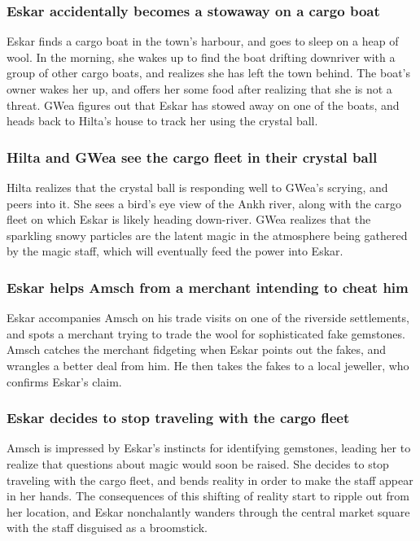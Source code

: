 \subsubsection{\Gls{Eskar} accidentally becomes a stowaway on a cargo boat}
\Gls{Eskar} finds a cargo boat in the town's harbour, and goes to sleep on a heap of wool. In the
morning, she wakes up to find the boat drifting downriver with a group of other cargo boats, and
realizes she has left the town behind. The boat's owner wakes her up, and offers her some food after
realizing that she is not a threat. \Gls{GWea} figures out that \Gls{Eskar} has stowed away on one
of the boats, and heads back to \Gls{Hilta}'s house to track her using the crystal ball.

\subsubsection{\Gls{Hilta} and \Gls{GWea} see the cargo fleet in their crystal ball}
\Gls{Hilta} realizes that the crystal ball is responding well to \Gls{GWea}'s scrying, and peers
into it. She sees a bird's eye view of the Ankh river, along with the cargo fleet on which
\Gls{Eskar} is likely heading down-river. \Gls{GWea} realizes that the sparkling snowy particles are
the latent magic in the atmosphere being gathered by the magic staff, which will eventually feed
the power into \Gls{Eskar}.

\subsubsection{\Gls{Eskar} helps \Gls{Amsch} from a merchant intending to cheat him}
\Gls{Eskar} accompanies \Gls{Amsch} on his trade visits on one of the riverside settlements, and
spots a merchant trying to trade the wool for sophisticated fake gemstones. \Gls{Amsch} catches
the merchant fidgeting when \Gls{Eskar} points out the fakes, and wrangles a better deal from him.
He then takes the fakes to a local jeweller, who confirms \Gls{Eskar}'s claim.

\subsubsection{\Gls{Eskar} decides to stop traveling with the cargo fleet}
\Gls{Amsch} is impressed by \Gls{Eskar}'s instincts for identifying gemstones, leading her to
realize that questions about magic would soon be raised. She decides to stop traveling with the
cargo fleet, and bends reality in order to make the staff appear in her hands. The consequences
of this shifting of reality start to ripple out from her location, and \Gls{Eskar} nonchalantly
wanders through the central market square with the staff disguised as a broomstick.

